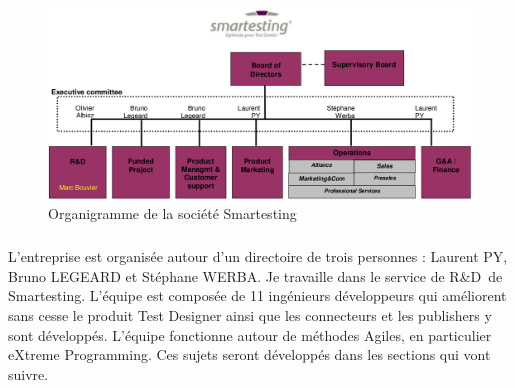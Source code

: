 \begin{figure}[!ht]
\centering
\includegraphics[width=\textwidth]{Illustrations/Organigramme_with_me.png}
\caption{Organigramme de la société Smartesting}
\label{figure:Organigramme de Smartesting}
\end{figure}

\subparagraph*{}
L'entreprise est organisée autour d'un directoire de trois personnes : Laurent PY, Bruno LEGEARD et Stéphane WERBA. Je travaille dans le service de R\&D{}\ de Smartesting.  L'équipe est composée de 11 ingénieurs développeurs qui améliorent sans cesse le produit Test Designer ainsi que les connecteurs et les publishers y sont développés. L'équipe fonctionne autour de méthodes Agiles, en particulier eXtreme Programming. Ces sujets seront développés dans les sections qui vont suivre.

\pagebreak

